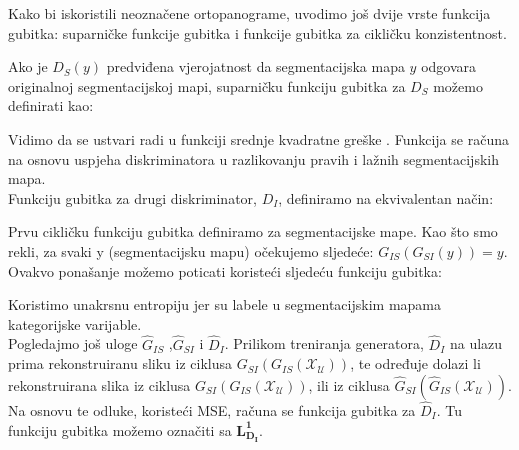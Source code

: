 \noindent Kako bi iskoristili neoznačene ortopanograme, uvodimo još dvije vrste funkcija gubitka: suparničke funkcije gubitka i funkcije gubitka za cikličku konzistentnost.

Ako je $D_{S}(y)$ predviđena vjerojatnost da segmentacijska mapa $y$ odgovara originalnoj segmentacijskoj mapi, suparničku funkciju gubitka za $D_{S}$ možemo definirati kao:

\begin{myequation}%
\end{myequation}

Vidimo da se ustvari radi u funkciji srednje kvadratne greške . Funkcija se računa na osnovu uspjeha diskriminatora u razlikovanju pravih i lažnih segmentacijskih mapa. \\

\noindent Funkciju gubitka za drugi diskriminator, $D_{I}$, definiramo na ekvivalentan način:

\begin{myequation}%
\end{myequation}

\noindent Prvu cikličku funkciju gubitka definiramo za segmentacijske mape. Kao što smo rekli, za svaki y (segmentacijsku mapu) očekujemo sljedeće: $G_{IS}(G_{SI}(y))  = y$. Ovakvo ponašanje možemo poticati koristeći sljedeću funkciju gubitka:


\begin{myequation}%
\end{myequation}

\noindent Koristimo unakrsnu entropiju jer su labele u segmentacijskim mapama kategorijske varijable. \\

\noindent Pogledajmo još uloge $\hat{G}_{IS}$ ,$\hat{G}_{SI}$ i $\hat{D}_{I}$. Prilikom treniranja generatora, $\hat{D}_{I}$ na ulazu prima rekonstruiranu sliku iz ciklusa $G_{SI}(G_{IS}(\mathcal{X_{U}}))$, te određuje  dolazi li rekonstruirana slika iz ciklusa $G_{SI}(G_{IS}(\mathcal{X_{U}}))$, ili iz ciklusa $\hat{G}_{SI}(\hat{G}_{IS}(\mathcal{X_{U}}))$. Na osnovu te odluke, koristeći MSE, računa se funkcija gubitka za $\hat{D}_{I}$. Tu funkciju gubitka možemo označiti sa $\bm{L_{D_{I}}^1}$.


